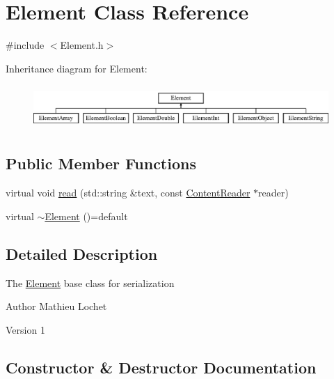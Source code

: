 \hypertarget{classElement}{}\section{Element Class Reference}
\label{classElement}


{\ttfamily \#include $<$Element.\+h$>$}

Inheritance diagram for Element\+:\begin{figure}[H]
\begin{center}
\leavevmode
\includegraphics[height=1.696970cm]{classElement}
\end{center}
\end{figure}
\subsection*{Public Member Functions}
\begin{DoxyCompactItemize}
\item 
virtual void \mbox{\hyperlink{classElement_ab468bd37a9558f5227837a9236bc9e4b}{read}} (std\+::string \&text, const \mbox{\hyperlink{classContentReader}{Content\+Reader}} $\ast$reader)
\item 
virtual \mbox{\hyperlink{classElement_aa153979c5d46fff8e2b9ee8b48dd863f}{$\sim$\+Element}} ()=default
\end{DoxyCompactItemize}


\subsection{Detailed Description}
The \mbox{\hyperlink{classElement}{Element}} base class for serialization

\begin{DoxyAuthor}{Author}
Mathieu Lochet 
\end{DoxyAuthor}
\begin{DoxyVersion}{Version}
1 
\end{DoxyVersion}


\subsection{Constructor \& Destructor Documentation}
\mbox{\label{classElement_aa153979c5d46fff8e2b9ee8b48dd863f}} 
